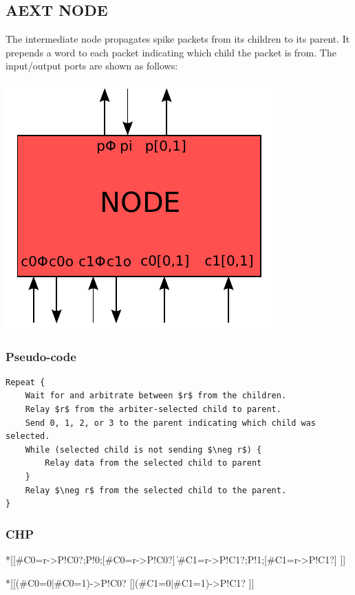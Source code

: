 \documentclass{article}
\begin{document}
\subsection{AEXT NODE \label{sec:AEXT_NODE}}

The intermediate node propagates spike packets from its children to its parent.
It prepends a word to each packet indicating which child the packet is from. 
The input/output ports are shown as follows:

\begin{center}
  \includegraphics[width=.25\textwidth]{img/aext_node.pdf}
\end{center}

\subsubsection*{Pseudo-code}

\begin{lstlisting}[mathescape]
Repeat {
    Wait for and arbitrate between $r$ from the children.
    Relay $r$ from the arbiter-selected child to parent.
    Send 0, 1, 2, or 3 to the parent indicating which child was selected.
    While (selected child is not sending $\neg r$) {
        Relay data from the selected child to parent
    }
    Relay $\neg r$ from the selected child to the parent.
}
\end{lstlisting}

\subsubsection*{CHP}

\begin{csp}
*[[#{C0=r}->P!C0?;P!0;[#{C0=\neg r}->P!C0?]
  \|#{C1=r}->P!C1?;P!1;[#{C1=\neg r}->P!C1?]
 ]]

*[[(#{C0=0}|#{C0=1})->P!C0?
  [](#{C1=0}|#{C1=1})->P!C1?
 ]]
\end{csp}
\end{document}
